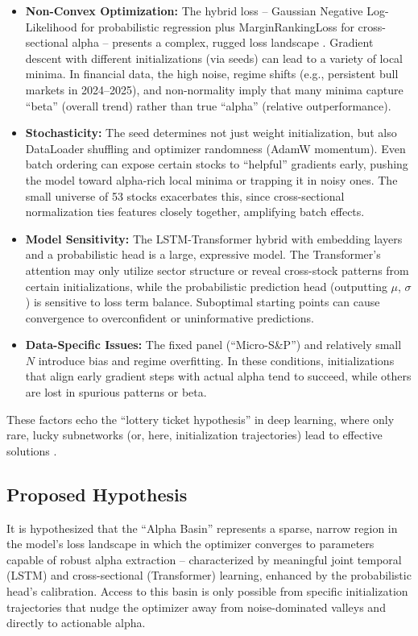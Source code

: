 \documentclass[twoside,final]{hcmut-report}
\begin{document}
\begin{itemize}[label=$\cdot$]
  \item \textbf{Non-Convex Optimization:} The hybrid loss -- Gaussian Negative Log-Likelihood for probabilistic regression plus MarginRankingLoss for cross-sectional alpha -- presents a complex, rugged loss landscape \cite{li2018visualizing}. Gradient descent with different initializations (via seeds) can lead to a variety of local minima. In financial data, the high noise, regime shifts (e.g., persistent bull markets in 2024--2025), and non-normality imply that many minima capture ``beta'' (overall trend) rather than true ``alpha'' (relative outperformance).
  \item \textbf{Stochasticity:} The seed determines not just weight initialization, but also DataLoader shuffling and optimizer randomness (AdamW momentum). Even batch ordering can expose certain stocks to ``helpful'' gradients early, pushing the model toward alpha-rich local minima or trapping it in noisy ones. The small universe of 53 stocks exacerbates this, since cross-sectional normalization ties features closely together, amplifying batch effects.
  \item \textbf{Model Sensitivity:} The LSTM-Transformer hybrid with embedding layers and a probabilistic head is a large, expressive model. The Transformer's attention may only utilize sector structure or reveal cross-stock patterns from certain initializations, while the probabilistic prediction head (outputting $\mu$, $\sigma$) is sensitive to loss term balance. Suboptimal starting points can cause convergence to overconfident or uninformative predictions.
  \item \textbf{Data-Specific Issues:} The fixed panel (``Micro-S\&P'') and relatively small $N$ introduce bias and regime overfitting. In these conditions, initializations that align early gradient steps with actual alpha tend to succeed, while others are lost in spurious patterns or beta.
\end{itemize}


These factors echo the ``lottery ticket hypothesis'' in deep learning, where only rare, lucky subnetworks (or, here, initialization trajectories) lead to effective solutions \cite{frankle2019lottery}.

\subsection{Proposed Hypothesis}

It is hypothesized that the ``Alpha Basin'' represents a sparse, narrow region in the model's loss landscape in which the optimizer converges to parameters capable of robust alpha extraction -- characterized by meaningful joint temporal (LSTM) and cross-sectional (Transformer) learning, enhanced by the probabilistic head's calibration. Access to this basin is only possible from specific initialization trajectories that nudge the optimizer away from noise-dominated valleys and directly to actionable alpha.
\end{document}
